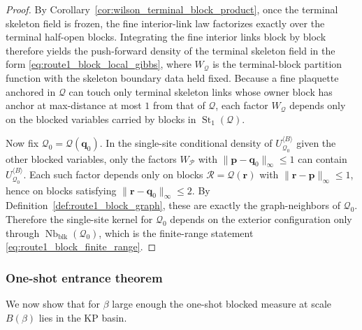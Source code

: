 \begin{proof}
By Corollary~\ref{cor:wilson_terminal_block_product}, once the terminal skeleton field is frozen, the fine interior-link law factorizes exactly over the terminal half-open blocks.
Integrating the fine interior links block by block therefore yields the push-forward density of the terminal skeleton field in the form \eqref{eq:route1_block_local_gibbs}, where $W_{\mathcal Q}$ is the terminal-block partition function with the skeleton boundary data held fixed.
Because a fine plaquette anchored in $\mathcal Q$ can touch only terminal skeleton links whose owner block has anchor at max-distance at most $1$ from that of $\mathcal Q$, each factor $W_{\mathcal Q}$ depends only on the blocked variables carried by blocks in $\operatorname{St}_1(\mathcal Q)$.

Now fix $\mathcal Q_0=\mathcal Q(\mathbf q_0)$.
In the single-site conditional density of $U^{\langle B\rangle}_{\mathcal Q_0}$ given the other blocked variables, only the factors $W_{\mathcal P}$ with $\|\mathbf p-\mathbf q_0\|_\infty\le 1$ can contain $U^{\langle B\rangle}_{\mathcal Q_0}$.
Each such factor depends only on blocks $\mathcal R=\mathcal Q(\mathbf r)$ with $\|\mathbf r-\mathbf p\|_\infty\le 1$, hence on blocks satisfying $\|\mathbf r-\mathbf q_0\|_\infty\le 2$.
By Definition~\ref{def:route1_block_graph}, these are exactly the graph-neighbors of $\mathcal Q_0$.
Therefore the single-site kernel for $\mathcal Q_0$ depends on the exterior configuration only through $\operatorname{Nb}_{\mathrm{blk}}(\mathcal Q_0)$, which is the finite-range statement \eqref{eq:route1_block_finite_range}.
\end{proof}

\subsubsection{One-shot entrance theorem}

We now show that for $\beta$ large enough the one-shot blocked measure at scale $B(\beta)$ lies in the KP basin.

